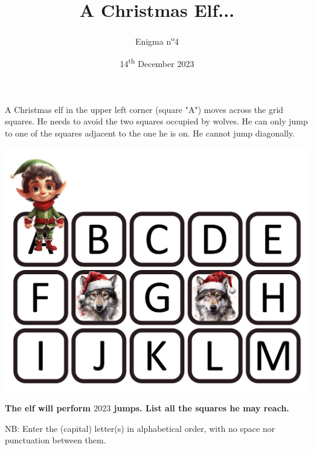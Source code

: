\documentclass[a4paper, top=10mm]{article}
\title{\textbf{\huge{A Christmas Elf...}}}
\author{Enigma n\textsuperscript{o}4}
\date{14\textsuperscript{th} December 2023}
\begin{document}
	\maketitle
	
	A Christmas elf in the upper left corner (square "A") moves across the grid squares.
	He needs to avoid the two squares occupied by wolves.
	He can only jump to one of the squares adjacent to the one he is on.
	He cannot jump diagonally.
	
	\begin{center}
		\includegraphics[width=\linewidth]{04map.png}\\
	\end{center}
	
	\textbf{The elf will perform $2023$ jumps.
	List all the squares he may reach.}
	
	NB: Enter the (capital) letter(s) in alphabetical order, with no space nor punctuation between them.
	
	
\end{document}
